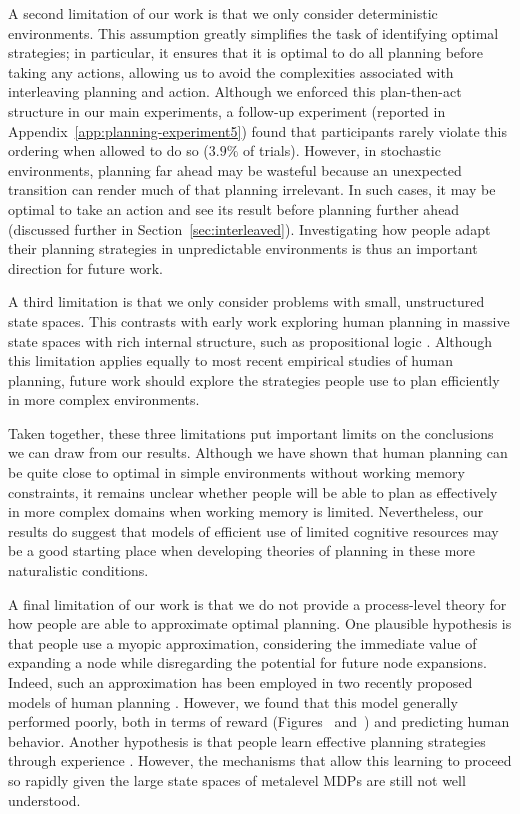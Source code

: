 A second limitation of our work is that we only consider deterministic environments. This assumption greatly simplifies the task of identifying optimal strategies; in particular, it ensures that it is optimal to do all planning before taking any actions, allowing us to avoid the complexities associated with interleaving planning and action. Although we enforced this plan-then-act structure in our main experiments, a follow-up experiment (reported in Appendix~\ref{app:planning-experiment5}) found that participants rarely violate this ordering when allowed to do so ($3.9\%$ of trials). However, in stochastic environments, planning far ahead may be wasteful because an unexpected transition can render much of that planning irrelevant. In such cases, it may be optimal to take an action and see its result before planning further ahead (discussed further in Section~\ref{sec:interleaved}). Investigating how people adapt their planning strategies in unpredictable environments is thus an important direction for future work.

A third limitation is that we only consider problems with small, unstructured state spaces. This contrasts with early work exploring human planning in massive state spaces with rich internal structure, such as propositional logic \citep{newell1972human}. Although this limitation applies equally to most recent empirical studies of human planning, future work should explore the strategies people use to plan efficiently in more complex environments.

Taken together, these three limitations put important limits on the conclusions we can draw from our results. Although we have shown that human planning can be quite close to optimal in simple environments without working memory constraints, it remains unclear whether people will be able to plan as effectively in more complex domains when working memory is limited. Nevertheless, our results do suggest that models of efficient use of limited cognitive resources may be a good starting place when developing theories of planning in these more naturalistic conditions.

A final limitation of our work is that we do not provide a process-level theory for how people are able to approximate optimal planning. One plausible hypothesis is that people use a myopic approximation, considering the immediate value of expanding a node while disregarding the potential for future node expansions. Indeed, such an approximation has been employed in two recently proposed models of human planning \citep{mattar2018prioritized,sezener2019optimizing}. However, we found that this model generally performed poorly, both in terms of reward (Figures~ and~) and predicting human behavior. Another hypothesis is that people learn effective planning strategies through experience \citep{lieder2017strategy,krueger2017enhancing}. However, the mechanisms that allow this learning to proceed so rapidly given the large state spaces of metalevel MDPs are still not well understood.

